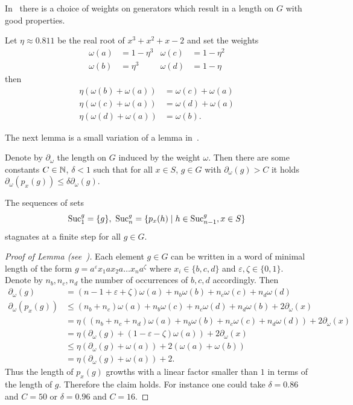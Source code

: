 \documentclass[a4paper,11pt]{amsart}
\begin{document}
In~\cite{Bartholdi:Growth} there is a choice of weights on generators which result in a length on $G$ with good properties.
\begin{lem} \label{lem:laurentsweights}
 Let $\eta\approx 0.811$ be the real root of $x^3+x^2+x-2$ and set the weights 
 \begin{align*}
  \omega(a) &= 1-\eta^3 & \omega(c)&=1-\eta^2 \\ \omega(b)&= \eta^3 & \omega(d)&=1-\eta
 \end{align*}
 then 
 \begin{align*}
  \eta(\omega(b)+\omega(a)) &= \omega(c)+\omega(a) \\
  \eta(\omega(c)+\omega(a)) &= \omega(d)+\omega(a) \\
  \eta(\omega(d)+\omega(a)) &= \omega(b).
 \end{align*}
\end{lem}
The next lemma is a small variation of a lemma in~\cite{Bartholdi:Growth}.
\begin{lem}
 Denote by $\partial_\omega$ the length on $G$ induced by the weight $\omega$. Then
 there are some constants $C\in\mathbb{N}$, $\delta<1$ such that for all $x\in S$, $g\in G$ 
 with $\partial_\omega(g)>C$ it holds 
 $\partial_\omega(p_x(g)) \leq \delta \partial_\omega(g)$.
\end{lem}
\begin{cor}
The sequences of sets
 \[\textup{Suc}_1^g=\{g\},\ \textup{Suc}_n^g = \{p_x(h) \mid h\in \textup{Suc}_{n-1}^g, x\in S\} \]
 stagnates at a finite step for all $g\in G$.
\end{cor}
\begin{proof}[Proof of Lemma (see~{\cite[Proposition~5]{Bartholdi:Growth}})] 
 Each element $g\in G$ can be written in a word of minimal length of the form $g=a^\varepsilon x_1 a x_2 a\ldots x_n a^\zeta$ where
 $x_i\in \{b,c,d\}$ and $\varepsilon,\zeta\in \{0,1\}$. Denote by $n_b,n_c,n_d$ the number of occurrences of $b,c,d$ accordingly. 
 Then
 \begin{align*}
  \partial_\omega(g) &= (n-1+\varepsilon+\zeta)\omega(a)+n_b\omega(b)+n_c\omega(c)+n_d\omega(d)\\
  \partial_\omega(p_x(g)) &\leq (n_b+n_c)\omega(a)+n_b\omega(c)+n_c\omega(d)+n_d\omega(b) + 2\partial_\omega(x)\\
  &= \eta\left( (n_b+n_c+n_d)\omega(a)+n_b\omega(b)+n_c\omega(c)+n_d\omega(d) \right) + 2\partial_\omega(x)\\
  &= \eta(\partial_\omega(g) +(1-\varepsilon-\zeta)\omega(a)) + 2\partial_\omega(x) \\
  &\leq \eta(\partial_\omega(g)+\omega(a)) + 2(\omega(a)+\omega(b))\\
  &= \eta(\partial_\omega(g)+\omega(a)) + 2.
 \end{align*}
 Thus the length of $p_x(g)$ growths with a linear factor smaller than $1$ in terms of the length of $g$. Therefore the claim holds.
 For instance one could take $\delta =0.86$ and $C=50$ or $\delta=0.96$ and $C=16$.
\end{proof}
\end{document}
